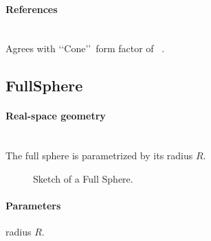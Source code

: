 \paragraph{References}\strut\\
Agrees with \lq\lq Cone\rq\rq\ form factor of \IsGISAXS~\cite{Laz02}.

\newpage
\subsection{FullSphere} 

\paragraph{Real-space geometry}\strut\\
The full sphere is parametrized by its radius $R$. 

\begin{figure}[ht]
\hfill
{}
\hfill
{}
\hfill
\caption{Sketch of a Full Sphere.}
\label{fig:fullsphere}
\end{figure}

\FloatBarrier

\paragraph{Parameters} radius $R$.

